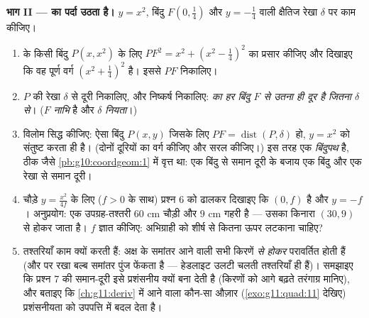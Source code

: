 \begin{problem}
\medskip
\noindent\textbf{भाग II ---  का पर्दा उठता है।}
 $y = x^2$, बिंदु $F\left(0, \frac14\right)$ और  $y = -\frac14$ वाली क्षैतिज रेखा $\delta$ पर काम
कीजिए।
\begin{enumerate}[resume]
  \item {} के किसी बिंदु $P(x, x^2)$ के लिए $PF^2 = x^2 + \left(x^2 - \frac14\right)^2$ का प्रसार कीजिए और दिखाइए कि
        वह पूर्ण वर्ग $\left(x^2 + \frac14\right)^2$ है। इससे $PF$ निकालिए।
  \item $P$ की रेखा $\delta$ से दूरी निकालिए, और निष्कर्ष निकालिए:
        \emph{ का हर बिंदु $F$ से उतना ही दूर है जितना $\delta$ से}।
        ($F$ \emph{नाभि} है और $\delta$ \emph{नियता}।)
  \item विलोम सिद्ध कीजिए: ऐसा बिंदु $P(x, y)$ जिसके लिए $PF = \operatorname{dist}(P, \delta)$ हो, $y = x^2$ को
        संतुष्ट करता ही है। (दोनों दूरियों का वर्ग कीजिए और सरल कीजिए।) इस
        तरह  एक \emph{बिंदुपथ} है, ठीक जैसे \cref{pb:g10:coordgeom:1} में वृत्त था: एक
        बिंदु से समान दूरी के बजाय एक बिंदु और एक रेखा से समान दूरी।
  \item चौड़े  $y = \frac{x^2}{4f}$ के लिए ($f > 0$ के साथ) प्रश्न 6 को ढालकर दिखाइए
        कि  $(0, f)$ है और  $y = -f$। अनुप्रयोग: एक उपग्रह-तश्तरी $60$
        cm चौड़ी और $9$ cm गहरी है --- उसका किनारा $(30, 9)$ से होकर जाता है।
        $f$ ज्ञात कीजिए: अभिग्राही को शीर्ष से कितना ऊपर लटकाना चाहिए?
  \item तश्तरियाँ काम क्यों करती हैं: अक्ष के समांतर आने वाली सभी किरणें
        \emph{ से होकर} परावर्तित होती हैं (और  पर रखा बल्ब समांतर
        पुंज फेंकता है --- हेडलाइट उलटी चलती तश्तरियाँ ही हैं)। समझाइए कि
        प्रश्न 7 की समान-दूरी इसे प्रशंसनीय क्यों बना देती है (किरणों को
        आगे बढ़ते तरंगाग्र मानिए), और बताइए कि \cref{ch:g11:deriv} में आने वाला कौन-सा
        औज़ार (\cref{exo:g11:quad:11} देखिए) प्रशंसनीयता को उपपत्ति में बदल देता है।
\end{enumerate}


\end{problem}
